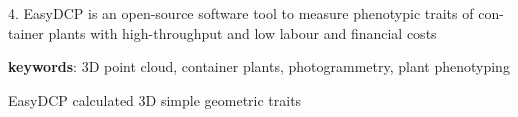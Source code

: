 \begin{center}
{\begin{minipage}{0.95\textwidth}
      4. EasyDCP is an open-source software tool to measure phenotypic traits of con-tainer plants with high-throughput and low labour and financial costs

      \vspace{5mm}
      \textbf{keywords}: 3D point cloud, container plants, photogrammetry, plant phenotyping

    \end{minipage}
  }
\end{center}

EasyDCP calculated 3D simple geometric traits